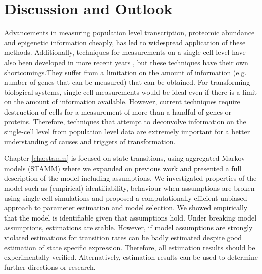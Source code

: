 
\chapter{Discussion and Outlook}
\label{cha:discussion-outlook}

Advancements in measuring population level transcription, proteomic abundance and epigenetic information cheaply, has led to widespread application of these methods. Additionally, techniques for measurements on a single-cell level have also been developed in more recent years \citep{Wheeler:2003ka, Dalerba:2011cc, Wang:2010ew}, but these techniques have their own shortcomings.They suffer from a limitation on the amount of information (e.g. number of genes that can be measured) that can be obtained. For transforming biological systems, single-cell measurements would be ideal even if there is a limit on the amount of information available. However, current techniques require destruction of cells for a measurement of more than a handful of genes or proteins. Therefore, techniques that attempt to deconvolve information on the single-cell level from population level data are extremely important for a better understanding of causes and triggers of transformation.

Chapter \ref{cha:stamm} is focused on state transitions, using aggregated Markov models (STAMM) where we expanded on previous work \citep{Armond:2013} and presented a full description of the model including assumptions. We investigated properties of the model such as (empirical) identifiability, behaviour when assumptions are broken using single-cell simulations and proposed a computationally efficient unbiased approach to parameter estimation and model selection. We showed empirically that the model is identifiable given that assumptions hold. Under breaking model assumptions, estimations are stable. However, if model assumptions are strongly violated estimations for transition rates can be badly estimated despite good estimation of state specific expression. Therefore, all estimation results should be experimentally verified. Alternatively, estimation results can be used to determine further directions or research.

